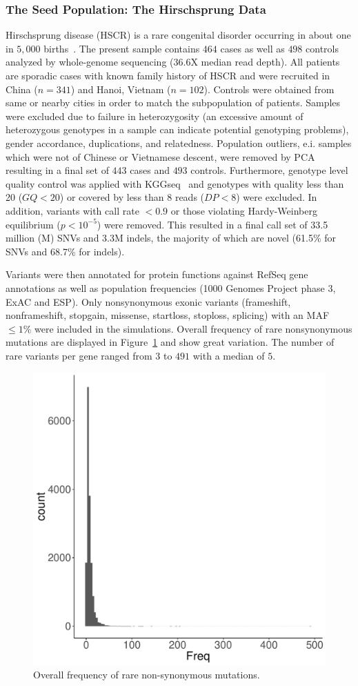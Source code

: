 \subsubsection{The Seed Population: The Hirschsprung Data}
\label{ssub:The_Seed_population:_The_Hirschsprung_data}
Hirschsprung disease (HSCR) is a rare congenital disorder occurring in about one in $5,000$ births~\cite{Amiel2001}.
The present sample contains $464$ cases as well as $498$ controls analyzed by whole-genome sequencing (36.6X median read depth).
All patients are sporadic cases with known family history of HSCR and were recruited in China ($n=341$) and Hanoi, Vietnam ($n=102$).
Controls were obtained from same or nearby cities in order to match the subpopulation of patients.
Samples were excluded due to failure in heterozygosity (an excessive amount of heterozygous genotypes in a sample can indicate potential genotyping problems), gender accordance, duplications, and relatedness.
Population outliers, e.i. samples which were not of Chinese or Vietnamese descent, were removed by PCA resulting in a final set of $443$ cases and $493$ controls.
Furthermore, genotype level quality control was applied with KGGseq~\cite{Li2012b} and genotypes with quality less than 20 ($GQ<20$) or covered by less than 8 reads ($DP<8$) were excluded.
In addition, variants with call rate $<0.9$ or those violating Hardy-Weinberg equilibrium ($p<10^{-5}$) were removed.
This resulted in a final call set of 33.5 million (M) SNVs and 3.3M indels, the majority of which are novel (61.5\% for SNVs and 68.7\% for indels). 

Variants were then annotated for protein functions against RefSeq gene annotations as well as population frequencies (1000 Genomes Project phase 3, ExAC and ESP).
Only nonsynonymous exonic variants (frameshift, nonframeshift, stopgain, missense, startloss, stoploss, splicing) with an MAF $\leq 1\%$ were included in the simulations. 
Overall frequency of rare nonsynonymous mutations are displayed in Figure~\ref{fig:num_var} and show great variation.
The number of rare variants per gene ranged from $3$ to $491$ with a median of $5$.

\begin{figure}[htpb]
  \centering
  \includegraphics[width=0.5\linewidth]{ksburden/figures/number_var_genes.pdf}
  \caption[Frequency of Rare Variants]{Overall frequency of rare non-synonymous mutations.}\label{fig:num_var}
\end{figure}

